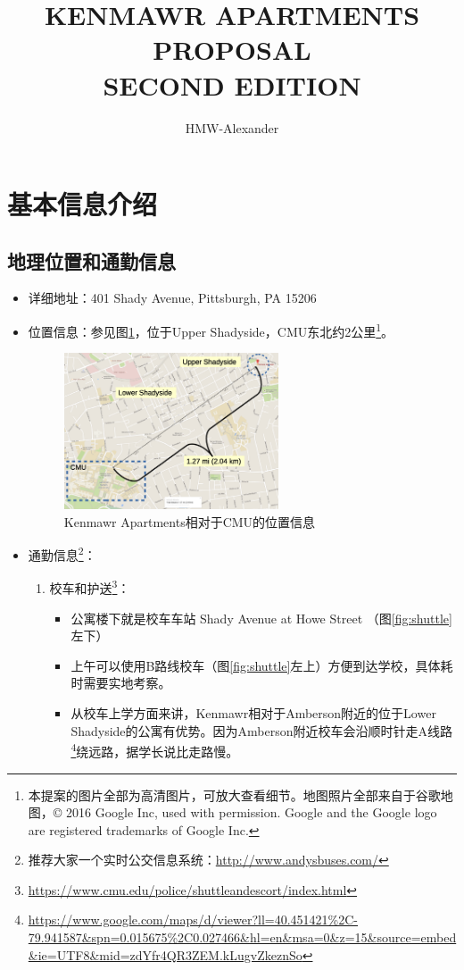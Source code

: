 \documentclass[nofonts,a4paper,11pt]{article}
\title{\textbf{KENMAWR APARTMENTS PROPOSAL}\\SECOND EDITION}
\author{HMW-Alexander}
\begin{document}
\maketitle

\section{基本信息介绍}
\subsection{地理位置和通勤信息}

\begin{itemize}
	\item 详细地址：401 Shady Avenue, Pittsburgh, PA 15206
	\item 位置信息：参见图\ref{fig:cmu-kenmawr}，位于Upper Shadyside，CMU东北约2公里\footnote{本提案的图片全部为高清图片，可放大查看细节。地图照片全部来自于谷歌地图，© 2016 Google Inc, used with permission. Google and the Google logo are registered trademarks of Google Inc.}。
	\begin{figure}[!htb]
	\centering
	\includegraphics[width=0.6\textwidth]{./img/cmu-kenmawr}
	\caption{Kenmawr Apartments相对于CMU的位置信息}
	\label{fig:cmu-kenmawr}
	\end{figure}
	\item 通勤信息\footnote{推荐大家一个实时公交信息系统：\url{http://www.andysbuses.com/}}：
	\begin{enumerate}
		\item 校车和护送\footnote{\url{https://www.cmu.edu/police/shuttleandescort/index.html}}：
		\begin{itemize}
			\item 公寓楼下就是校车车站 Shady Avenue at Howe Street （图\ref{fig:shuttle}左下）
			\item 上午可以使用B路线校车（图\ref{fig:shuttle}左上）方便到达学校，具体耗时需要实地考察。
			\item 从校车上学方面来讲，Kenmawr相对于Amberson附近的位于Lower Shadyside的公寓有优势。因为Amberson附近校车会沿顺时针走A线路\footnote{\url{https://www.google.com/maps/d/viewer?ll=40.451421\%2C-79.941587\&spn=0.015675\%2C0.027466\&hl=en\&msa=0\&z=15\&source=embed\&ie=UTF8\&mid=zdYfr4QR3ZEM.kLugvZkeznSo}}绕远路，据学长说比走路慢。

\end{itemize}
\end{enumerate}
\end{itemize}
\end{document}
